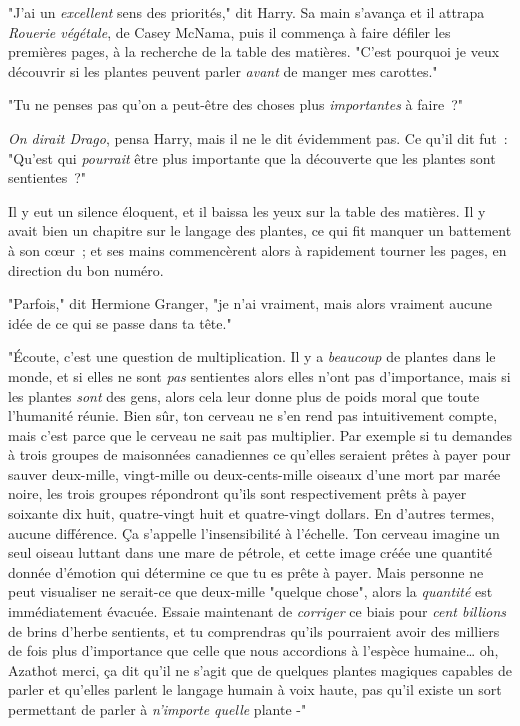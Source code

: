 "J'ai un \emph{excellent} sens des priorités," dit Harry. Sa main s'avança et il attrapa \emph{Rouerie végétale}, de Casey McNama, puis il commença à faire défiler les premières pages, à la recherche de la table des matières. "C'est pourquoi je veux découvrir si les plantes peuvent parler \emph{avant} de manger mes carottes."

"Tu ne penses pas qu'on a peut-être des choses plus \emph{importantes} à faire~?"

\emph{On dirait Drago}, pensa Harry, mais il ne le dit évidemment pas. Ce qu'il dit fut~: "Qu'est qui \emph{pourrait} être plus importante que la découverte que les plantes sont sentientes~?"

Il y eut un silence éloquent, et il baissa les yeux sur la table des matières. Il y avait bien un chapitre sur le langage des plantes, ce qui fit manquer un battement à son cœur~; et ses mains commencèrent alors à rapidement tourner les pages, en direction du bon numéro.

"Parfois," dit Hermione Granger, "je n'ai vraiment, mais alors vraiment aucune idée de ce qui se passe dans ta tête."

"Écoute, c'est une question de multiplication. Il y a \emph{beaucoup} de plantes dans le monde, et si elles ne sont \emph{pas} sentientes alors elles n'ont pas d'importance, mais si les plantes \emph{sont} des gens, alors cela leur donne plus de poids moral que toute l'humanité réunie. Bien sûr, ton cerveau ne s'en rend pas intuitivement compte, mais c'est parce que le cerveau ne sait pas multiplier. Par exemple si tu demandes à trois groupes de maisonnées canadiennes ce qu'elles seraient prêtes à payer pour sauver deux-mille, vingt-mille ou deux-cents-mille oiseaux d'une mort par marée noire, les trois groupes répondront qu'ils sont respectivement prêts à payer soixante dix huit, quatre-vingt huit et quatre-vingt dollars. En d'autres termes, aucune différence. Ça s'appelle l'insensibilité à l'échelle. Ton cerveau imagine un seul oiseau luttant dans une mare de pétrole, et cette image créée une quantité donnée d'émotion qui détermine ce que tu es prête à payer. Mais personne ne peut visualiser ne serait-ce que deux-mille "quelque chose", alors la \emph{quantité} est immédiatement évacuée. Essaie maintenant de \emph{corriger} ce biais pour \emph{cent billions} de brins d'herbe sentients, et tu comprendras qu'ils pourraient avoir des milliers de fois plus d'importance que celle que nous accordions à l'espèce humaine… oh, Azathot merci, ça dit qu'il ne s'agit que de quelques plantes magiques capables de parler et qu'elles parlent le langage humain à voix haute, pas qu'il existe un sort permettant de parler à \emph{n'importe quelle} plante -"

